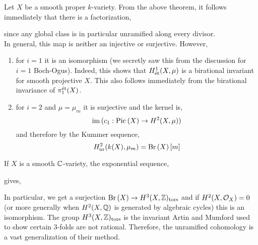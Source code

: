 \documentclass[12pt]{article}
\begin{document}
Let $X$ be a smooth proper $k$-variety. From the above theorem, it follows immediately that there is a factorization,
\begin{center}
\end{center}
since any global class is in particular unramified along every divisor. 
\bigskip\\
In general, this map is neither an injective or surjective. However,
\begin{enumerate}
\item for $i = 1$ it is an isomorphism (we secretly saw this from the discussion for $i = 1$ Boch-Ogus). Indeed, this shows that $H^1_{\text{\'{e}t}}(X, \mu)$ is a birational invariant for smooth projective $X$. This also follows immediately from the birational invariance of $\pi_1^{\text{\'{e}t}}(X)$.

\item for $i = 2$ and $\mu = \mu_m$ it is surjective and the kernel is,
\[ \operatorname{\mathrm{im}}{(c_1 : \mathrm{Pic}^{} \left( X \right) \to H^2(X, \mu))} \]
and therefore by the Kummer sequence,
\[ H^2_{\mathrm{nr}}(k(X), \mu_m) = \mathrm{Br} \left( X \right)[m] \]
\end{enumerate}


\begin{rmk}
If $X$ is a smooth $\mathbb{C}$-variety, the exponential sequence,
\begin{center}
\end{center}
gives,
\begin{center}
\end{center}

In particular, we get a surjection $\mathrm{Br} \left( X \right) \to H^3(X, \mathbb{Z})_{\mathrm{tors}}$ and if $H^2(X, \mathcal{O}_{X}) = 0$ (or more generally when $H^2(X, \mathbb{Q})$ is generated by algebraic cycles) this is an isomorphism. The group $H^3(X, \mathbb{Z})_{\mathrm{tors}}$ is the invariant Artin and Mumford used to show certain 3-folds are not rational. Therefore, the unramified cohomology is a vast generalization of their method. 
\end{rmk}
\end{document}
